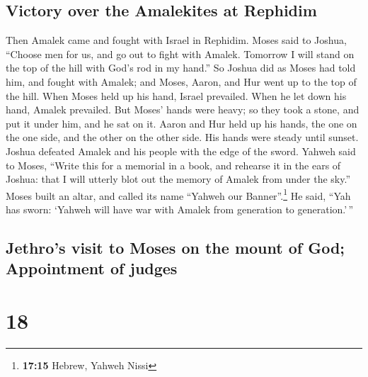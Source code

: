 \hypertarget{victory-over-the-amalekites-at-rephidim}{%
\subsection{Victory over the Amalekites at
Rephidim}\label{victory-over-the-amalekites-at-rephidim}}

 Then Amalek came and fought with Israel in Rephidim.
 Moses said to Joshua, ``Choose men for us, and go out to
fight with Amalek. Tomorrow I will stand on the top of the hill with
God's rod in my hand.''  So Joshua did as Moses had told
him, and fought with Amalek; and Moses, Aaron, and Hur went up to the
top of the hill.  When Moses held up his hand, Israel
prevailed. When he let down his hand, Amalek prevailed. 
But Moses' hands were heavy; so they took a stone, and put it under him,
and he sat on it. Aaron and Hur held up his hands, the one on the one
side, and the other on the other side. His hands were steady until
sunset.  Joshua defeated Amalek and his people with the
edge of the sword.  Yahweh said to Moses, ``Write this
for a memorial in a book, and rehearse it in the ears of Joshua: that I
will utterly blot out the memory of Amalek from under the sky.''
 Moses built an altar, and called its name ``Yahweh our
Banner''.\footnote{\textbf{17:15} Hebrew, Yahweh Nissi} 
He said, ``Yah has sworn: `Yahweh will have war with Amalek from
generation to generation.'\,''

\hypertarget{jethros-visit-to-moses-on-the-mount-of-god-appointment-of-judges}{%
\subsection{Jethro's visit to Moses on the mount of God; Appointment of
judges}\label{jethros-visit-to-moses-on-the-mount-of-god-appointment-of-judges}}

\hypertarget{section-17}{%
\section{18}\label{section-17}}

